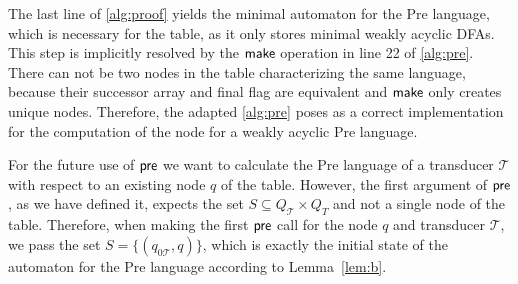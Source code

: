 \par 

The last line of \autoref{alg:proof} yields the minimal automaton for the Pre language, which is necessary for the table, as it only stores minimal weakly acyclic DFAs. This step is implicitly resolved by the $\operatorname{\textsf{make}}$ operation in line 22 of \autoref{alg:pre}. There can not be two nodes in the table characterizing the same language, because their successor array and final flag are equivalent and $\operatorname{\textsf{make}}$ only creates unique nodes.
Therefore, the adapted \autoref{alg:pre} poses as a correct implementation for the computation of the node for a weakly acyclic Pre language.

\par 

For the future use of $\operatorname{\textsf{pre}}$ we want to calculate the Pre language of a transducer $\mathcal{T}$ with respect to an existing node $q$ of the table. However, the first argument of $\operatorname{\textsf{pre}}$, as we have defined it, expects the set $S \subseteq Q_{\mathcal{T}} \times Q_{T}$ and not a single node of the table. Therefore, when making the first $\operatorname{\textsf{pre}}$ call for the node $q$ and transducer $\mathcal{T}$, we pass the set $S = \{ (q_{0\mathcal{T}},q) \}$, which is exactly the initial state of the automaton for the Pre language according to Lemma~\autoref{lem:b}.